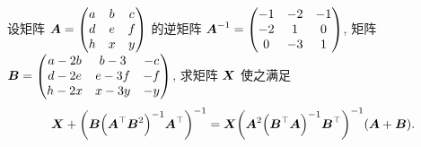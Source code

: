 \begin{example}[2016 浙江大学]
    设矩阵 $\vb*{A}=\begin{pmatrix}
            a & b & c \\
            d & e & f \\
            h & x & y
        \end{pmatrix}$ 的逆矩阵 $\vb*{A}^{-1}=\begin{pmatrix}
            -1 & -2 & -1 \\
            -2 & 1  & 0  \\
            0  & -3 & 1
        \end{pmatrix}$, 矩阵 $\vb*{B}=\begin{pmatrix}
            a-2b & b-3  & -c \\
            d-2e & e-3f & -f \\
            h-2x & x-3y & -y
        \end{pmatrix}$, 求矩阵 $\vb*{X}$ 使之满足
    $$\vb*{X}+\qty(\vb*{B}\qty(\vb*{A}^{\top}\vb*{B}^2)^{-1}\vb*{A}^{\top})^{-1}=\vb*{X}\qty(\vb*{A}^2\qty(\vb*{B}^{\top}\vb*{A})^{-1}\vb*{B}^{\top})^{-1}(\vb*{A}+\vb*{B}).$$
\end{example}
